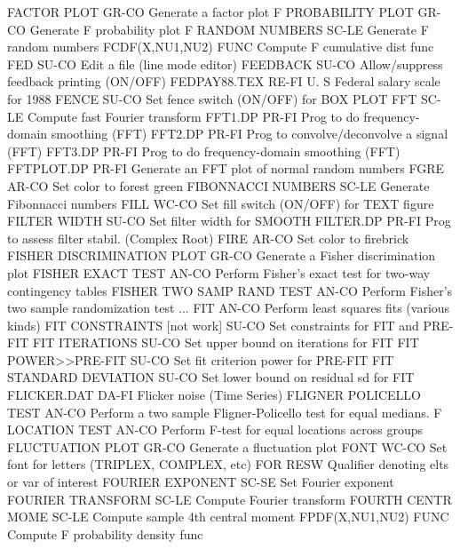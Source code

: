 FACTOR PLOT                 GR-CO Generate  a factor plot
F PROBABILITY PLOT          GR-CO Generate F probability plot
F RANDOM NUMBERS            SC-LE Generate F random numbers
FCDF(X,NU1,NU2)             FUNC  Compute F cumulative dist func
FED                         SU-CO Edit a file (line mode editor)
FEEDBACK                    SU-CO Allow/suppress feedback printing (ON/OFF)
FEDPAY88.TEX                RE-FI U. S Federal salary scale for 1988
FENCE                       SU-CO Set fence switch (ON/OFF) for BOX PLOT
FFT                         SC-LE Compute fast Fourier transform
FFT1.DP                     PR-FI Prog to do frequency-domain smoothing (FFT)
FFT2.DP                     PR-FI Prog to convolve/deconvolve a signal (FFT)
FFT3.DP                     PR-FI Prog to do frequency-domain smoothing (FFT)
FFTPLOT.DP                  PR-FI Generate an FFT plot of normal random numbers
FGRE                        AR-CO Set color to forest green
FIBONNACCI NUMBERS          SC-LE Generate Fibonnacci numbers
FILL                        WC-CO Set fill switch (ON/OFF) for TEXT figure
FILTER WIDTH                SU-CO Set filter width for SMOOTH
FILTER.DP                   PR-FI Prog to assess filter stabil. (Complex Root)
FIRE                        AR-CO Set color to firebrick
FISHER DISCRIMINATION PLOT  GR-CO Generate a Fisher discrimination plot
FISHER EXACT TEST           AN-CO Perform Fisher's exact test for two-way contingency tables
FISHER TWO SAMP RAND TEST   AN-CO Perform Fisher's two sample randomization test
... FIT                     AN-CO Perform least squares fits (various kinds)
FIT CONSTRAINTS [not work]  SU-CO Set constraints for FIT and PRE-FIT
FIT ITERATIONS              SU-CO Set upper bound on iterations for FIT
FIT POWER>>PRE-FIT          SU-CO Set fit criterion power for PRE-FIT
FIT STANDARD DEVIATION      SU-CO Set lower bound on residual sd for FIT
FLICKER.DAT                 DA-FI Flicker noise (Time Series)
FLIGNER POLICELLO TEST      AN-CO Perform a two sample Fligner-Policello test for equal medians.
F LOCATION TEST             AN-CO Perform F-test for equal locations across groups
FLUCTUATION PLOT            GR-CO Generate  a fluctuation plot
FONT                        WC-CO Set font for letters (TRIPLEX, COMPLEX, etc)
FOR                         RESW  Qualifier denoting elts or var of interest
FOURIER EXPONENT            SC-SE Set Fourier exponent
FOURIER TRANSFORM           SC-LE Compute Fourier transform
FOURTH CENTR MOME           SC-LE Compute sample 4th central moment
FPDF(X,NU1,NU2)             FUNC  Compute F probability density func
